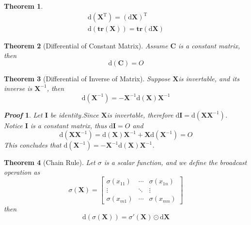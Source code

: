 \documentclass{article}
\newcommand{\Transpose}{\ensuremath{\mathrm{T}}}
\newcommand{\Trace}{\ensuremath{\mathbf{tr}}}
\newcommand{\Differential}{\ensuremath{\mathrm{d}}}
\newcommand{\MatrixSymbol}[1]{\ensuremath{{\boldsymbol{#1}}}}
\newcommand{\MatrixX}{\MatrixSymbol{X}}
\newtheorem{Theorem}{Theorem}[section]
\theoremstyle{nonumberplain}
\newtheorem{Proof}{\textit{\textbf{Proof}}}
\begin{document}
\begin{Theorem}
    \begin{gather}
        \Differential(\MatrixX^\Transpose)=(\Differential\MatrixX)^\Transpose\\
        \Differential(\Trace(\MatrixX))=\Trace(\Differential\MatrixX)
    \end{gather}
\end{Theorem}
\begin{Theorem}[Differential of Constant Matrix]
    Assume \MatrixSymbol{C} is a constant matrix, then 
    \begin{equation}
        \Differential(\MatrixSymbol{C})=O
    \end{equation}
\end{Theorem}
\begin{Theorem}[Differential of Inverse of Matrix]
    Suppose \MatrixX is invertable, and its inverse is $\MatrixX^{-1}$, then 
    \begin{equation}
        \Differential(\MatrixX^{-1})=-\MatrixX^{-1}\Differential(\MatrixX)\MatrixX^{-1}
    \end{equation}
\end{Theorem}
\begin{Proof}
    Let $\MatrixSymbol{I}$ be identity.Since \MatrixX is invertable, therefore $\Differential\MatrixSymbol{I}=\Differential(\MatrixX\MatrixX^{-1})$. Notice \MatrixSymbol{I} is a constant matrix, thus $\Differential\MatrixSymbol{I}=O$ and 
    \begin{equation*}
        \Differential(\MatrixX\MatrixX^{-1})=\Differential(\MatrixX)\MatrixX^{-1}+\MatrixX\Differential(\MatrixX^{-1})=O
    \end{equation*}
    This concludes that $\Differential(\MatrixX^{-1})=-\MatrixX^{-1}\Differential(\MatrixX)\MatrixX^{-1}$.
\end{Proof}
\begin{Theorem}[Chain Rule]
    Let $\sigma$ is a scalar function, and we define the broadcast operation as
    \begin{equation*}
        \sigma(\MatrixX)=\begin{bmatrix}
            \sigma(x_{11})&\cdots&\sigma(x_{1n})\\
            \vdots&\ddots&\vdots\\
            \sigma(x_{m1})&\cdots&\sigma(x_{mn})
        \end{bmatrix}
    \end{equation*}
    then\begin{equation}
        \Differential\left(\sigma(\MatrixX)\right)=\sigma'(\MatrixX)\odot\Differential\MatrixX
    \end{equation}
\end{Theorem}
\end{document}
